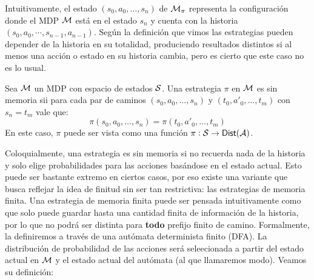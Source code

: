 Intuitivamente, el estado $(s_0, a_0, \dots, s_n)$ de $\mathcal{M}_\pi$ representa la
configuración donde el MDP $\mathcal{M}$ está en el estado $s_n$ y cuenta con la
historia $(s_0, a_0, \cdots, s_{n-1}, a_{n-1})$. Según la definición que vimos
las estrategias pueden depender de la historia en su totalidad, produciendo
resultados distintos si al menos una acción o estado en su historia cambia,
pero es cierto que este caso no es lo usual.

\begin{definition}
	Sea $\mathcal{M}$ un MDP con espacio de estados $\mathcal{S}$. Una estrategia $\pi$ en $\mathcal{M}$ es sin memoria sii para cada par de caminos $(s_0, a_0, \dots, s_n)$ y $(t_0, a'_0, \dots, t_m)$ con $s_n = t_m$ vale que:
	$$\pi(s_0, a_0, \dots, s_n) = \pi(t_0, a'_0, \dots, t_m)$$
	En este caso, $\pi$ puede ser vista como una función $\pi : \mathcal{S} \rightarrow \mathsf{Dist}(\mathcal{A})$.
\end{definition}

Coloquialmente, una estrategia es sin memoria si no recuerda nada de la
historia y solo elige probabilidades para las acciones basándose en el estado
actual. Esto puede ser bastante extremo en ciertos casos, por eso existe una
variante que busca reflejar la idea de finitud sin ser tan restrictiva: las
estrategias de memoria finita. Una estrategia de memoria finita puede ser
pensada intuitivamente como que solo puede guardar hasta una cantidad finita de
información de la historia, por lo que no podrá ser distinta para \textbf{todo}
prefijo finito de camino. Formalmente, la definiremos a través de una autómata
determinista finito (DFA). La distribución de probabilidad de las acciones será
seleecionada a partir del estado actual en $\mathcal{M}$ y el estado actual del autómata
(al que llamaremos modo). Veamos su definición:

